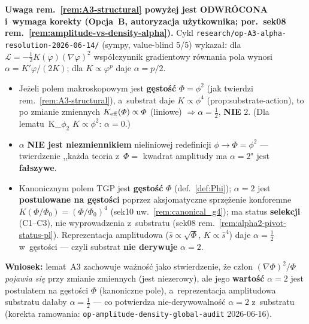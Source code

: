 \begin{uwaga}[KOREKTA \texttt{op-A3-alpha-resolution} (2026-06-14) --- $\alpha$ NIE jest niezmiennikiem $\Phi=\phi^2$]
\label{rem:A3-correction-alpha}
\textbf{Uwaga rem.~\ref{rem:A3-structural} powy\.zej jest ODWR\'OCONA i~wymaga korekty
(Opcja~B, autoryzacja u\.zytkownika; por.\ sek08 rem.~\ref{rem:amplitude-vs-density-alpha}).}
Cykl \texttt{research/op-A3-alpha-resolution-2026-06-14/} (sympy, value-blind 5/5) wykaza\l{}:
dla $\mathcal L=-\tfrac12 K(\varphi)(\nabla\varphi)^2$ wsp\'o\l{}czynnik gradientowy r\'ownania pola wynosi
$\alpha=K'\varphi/(2K)$; dla $K\propto\varphi^p$ daje $\alpha=p/2$.
\begin{itemize}[nosep]
  \item Je\.zeli polem makroskopowym jest \textbf{g\k{e}sto\'s\'c} $\Phi=\phi^2$ (jak twierdzi rem.~\ref{rem:A3-structural}),
    a~substrat daje $K\propto\phi^4$ (prop:substrate-action), to po zmianie zmiennych
    $K_{\rm eff}(\Phi)\propto\Phi$ (liniowe) $\Rightarrow \boxed{\alpha=\tfrac12}$, \textbf{NIE} $2$.
    (Dla lematu~K\_$\phi_2$ $K\propto\phi^2$: $\alpha=0$.)
  \item $\alpha$ \textbf{NIE jest niezmiennikiem} nieliniowej redefinicji $\phi\to\Phi=\phi^2$ ---
    twierdzenie ,,ka\.zda teoria z~$\Phi=$ kwadrat amplitudy ma $\alpha=2$" jest \textbf{fa\l{}szywe}.
  \item Kanonicznym polem TGP jest \textbf{g\k{e}sto\'s\'c} $\Phi$ (def.~\ref{def:Phi}); $\alpha=2$ jest
    \textbf{postulowane na g\k{e}sto\'sci} poprzez aksjomatyczne sprz\k{e}\.zenie konforemne
    $K(\Phi/\Phi_0)=(\Phi/\Phi_0)^4$ (sek10 uw.~\ref{rem:canonical_g4}); ma status \textbf{selekcji} (C1--C3),
    nie wyprowadzenia z~substratu (sek08 rem.~\ref{rem:alpha2-pivot-status-pl}). Reprezentacja amplitudowa
    ($\hat s\propto\sqrt{\Phi}$, $K\propto\hat s^4$) daje $\alpha=\tfrac12$ w~g\k{e}sto\'sci ---
    czyli substrat \textbf{nie derywuje} $\alpha=2$.
\end{itemize}
\textbf{Wniosek:} lemat~A3 zachowuje wa\.zno\'s\'c jako stwierdzenie, \.ze cz\l{}on $(\nabla\Phi)^2/\Phi$
\emph{pojawia si\k{e}} przy zmianie zmiennych (jest niezerowy), ale jego \textbf{warto\'s\'c} $\alpha=2$
jest postulatem na g\k{e}sto\'sci $\Phi$ (kanoniczne pole), a~reprezentacja amplitudowa substratu da\l{}aby
$\alpha=\tfrac12$ --- co potwierdza nie-derywowalno\'s\'c $\alpha=2$ z~substratu (korekta ramowania:
\texttt{op-amplitude-density-global-audit} 2026-06-16).


\end{uwaga}

